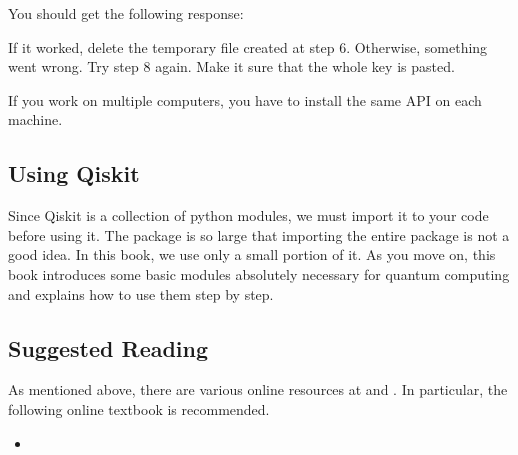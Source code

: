 \documentclass[letterpaper,10pt,english]{jupyterBook}
\begin{document}
\begin{sphinxVerbatim}[commandchars=\\\{\}]
\end{sphinxVerbatim}

\sphinxAtStartPar
You should get the following response:

\begin{sphinxVerbatim}[commandchars=\\\{\}]
    
\end{sphinxVerbatim}

\sphinxAtStartPar
If it worked, delete the temporary file created at step 6.  Otherwise, something went wrong. Try step 8 again.  Make it sure that the whole key is pasted.

\sphinxAtStartPar
If you work on multiple computers, you have to install the same API on each machine.


\subsection{Using Qiskit}
\label{\detokenize{preparation/qiskit:using-qiskit}}
\sphinxAtStartPar
Since Qiskit is a collection of python modules, we must import it to your code before using it.  The package is so large that importing the entire package is not a good idea. In this book, we use only a small portion of it.  As you move on, this book introduces some basic modules absolutely necessary for quantum computing and explains how to use them step by step.


\subsection{Suggested Reading}
\label{\detokenize{preparation/qiskit:suggested-reading}}
\sphinxAtStartPar
As mentioned above, there are various online resources at  and . In particular, the following online textbook is recommended.
\begin{itemize}
\item {}
\sphinxAtStartPar
{}

\end{itemize}
\end{document}
